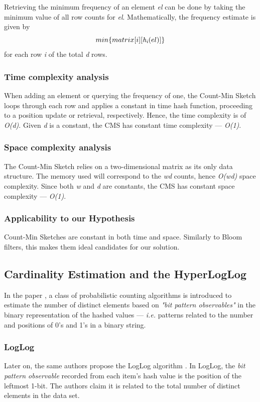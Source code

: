 Retrieving the minimum frequency of an element \textit{el} can be done by taking the minimum value of all row counts for \textit{el}. Mathematically, the frequency estimate is given by
\[ min \{matrix[i][\textit{h\textsubscript{i}}(el)]\} \]
for each row \textit{i} of the total \textit{d} rows.    


\subsubsection*{Time complexity analysis}
When adding an element or querying the frequency of one, the Count-Min Sketch loops through each row and applies a constant in time hash function, proceeding to a position update or retrieval, respectively. Hence, the time complexity is of \textit{O(d)}. Given \textit{d} is a constant, the CMS has constant time complexity --- \textit{O(1)}.

\subsubsection*{Space complexity analysis}
The Count-Min Sketch relies on a two-dimensional matrix as its only data structure. The memory used will correspond to the \textit{wd} counts, hence \textit{O(wd)} space complexity. Since both \textit{w} and \textit{d} are constants, the CMS has constant space complexity --- \textit{O(1)}.

\subsubsection*{Applicability to our Hypothesis}
Count-Min Sketches are constant in both time and space. Similarly to Bloom filters, this makes them ideal candidates for our solution. 

\subsection{Cardinality Estimation and the HyperLogLog}
In the paper \cite{Flajolet-PCA}, a class of probabilistic counting algorithms is introduced to estimate the number of distinct elements based on \textit{"bit pattern observables"} in the binary representation of the hashed values --- \textit{i.e.} patterns related to the number and positions of 0's and 1's in a binary string.

\subsubsection{LogLog}
Later on, the same authors propose the LogLog algorithm \cite{Flajolet-LogLog}. In LogLog, the \textit{bit pattern observable} recorded from each item's hash value is the position of the leftmost 1-bit. The authors claim it is related to the total number of distinct elements in the data set.

